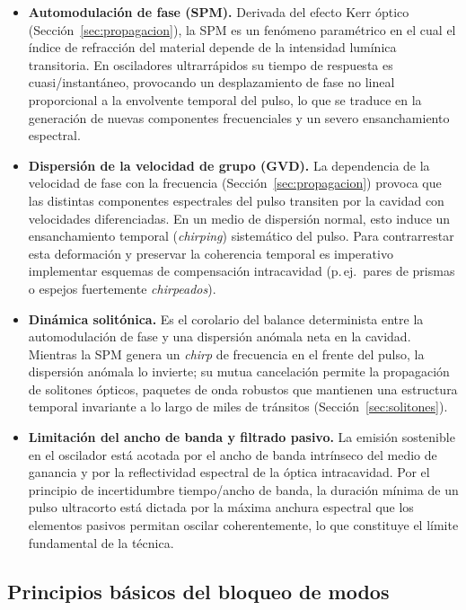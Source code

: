 \begin{itemize}
    \item \textbf{Automodulación de fase (SPM).} Derivada del efecto Kerr óptico
    (Sección~\ref{sec:propagacion}), la SPM es un fenómeno paramétrico en el cual
    el índice de refracción del material depende de la intensidad lumínica
    transitoria. En osciladores ultrarrápidos su tiempo de respuesta es
    cuasi\-/instantáneo, provocando un desplazamiento de fase no lineal proporcional
    a la envolvente temporal del pulso, lo que se traduce en la generación de
    nuevas componentes frecuenciales y un severo ensanchamiento espectral.

    \item \textbf{Dispersión de la velocidad de grupo (GVD).} La dependencia de la
    velocidad de fase con la frecuencia (Sección~\ref{sec:propagacion}) provoca que
    las distintas componentes espectrales del pulso transiten por la cavidad con
    velocidades diferenciadas. En un medio de dispersión normal, esto induce un
    ensanchamiento temporal (\emph{chirping}) sistemático del pulso. Para
    contrarrestar esta deformación y preservar la coherencia temporal es imperativo
    implementar esquemas de compensación intracavidad (p.\,ej.\ pares de prismas o
    espejos fuertemente \emph{chirpeados}).

    \item \textbf{Dinámica solitónica.} Es el corolario del balance determinista
    entre la automodulación de fase y una dispersión anómala neta en la cavidad.
    Mientras la SPM genera un \emph{chirp} de frecuencia en el frente del pulso, la
    dispersión anómala lo invierte; su mutua cancelación permite la propagación de
    solitones ópticos, paquetes de onda robustos que mantienen una estructura
    temporal invariante a lo largo de miles de tránsitos
    (Sección~\ref{sec:solitones}).

    \item \textbf{Limitación del ancho de banda y filtrado pasivo.} La emisión
    sostenible en el oscilador está acotada por el ancho de banda intrínseco del
    medio de ganancia y por la reflectividad espectral de la óptica intracavidad.
    Por el principio de incertidumbre tiempo\-/ancho de banda, la duración mínima
    de un pulso ultracorto está dictada por la máxima anchura espectral que los
    elementos pasivos permitan oscilar coherentemente, lo que constituye el límite
    fundamental de la técnica.
\end{itemize}

\subsection{Principios básicos del bloqueo de modos}
\label{sec:principios_mode_locking}

